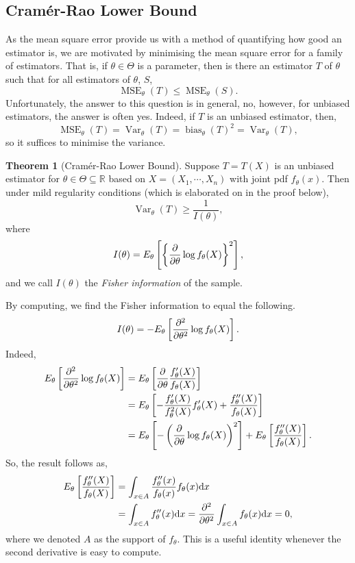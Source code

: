 \documentclass[
]{article}
\theoremstyle{definition}
\newtheorem{theorem}{Theorem}
\theoremstyle{definition}
\begin{document}
\hypertarget{cramuxe9r-rao-lower-bound}{%
\subsection{Cramér-Rao Lower Bound}\label{cramuxe9r-rao-lower-bound}}

As the mean square error provide us with a method of quantifying how
good an estimator is, we are motivated by minimising the mean square
error for a family of estimators. That is, if \(\theta \in \Theta\) is a
parameter, then is there an estimator \(T\) of \(\theta\) such that for
all estimators of \(\theta\), \(S\),
\[{\mathop{\mathrm{MSE}}}_{\theta}(T) \le {\mathop{\mathrm{MSE}}}_{\theta}(S).\]
Unfortunately, the answer to this question is in general, no, however,
for unbiased estimators, the answer is often yes. Indeed, if \(T\) is an
unbiased estimator, then,
\[{\mathop{\mathrm{MSE}}}_{\theta}(T) = {\mathop{\mathrm{Var}}}_\theta(T) = {\mathop{\mathrm{bias}}}_{\theta}(T)^2 = {\mathop{\mathrm{Var}}}_\theta(T),\]
so it suffices to minimise the variance.

\begin{theorem}[Cramér-Rao Lower Bound]
  Suppose \(T = T(X)\) is an unbiased estimator for \(\theta \in \Theta \subseteq \mathbb{R}\) 
  based on \(X = (X_1, \cdots, X_n)\) with joint pdf \(f_\theta(x)\). Then under 
  mild regularity conditions (which is elaborated on in the proof below),
  \[{\mathop{\mathrm{Var}}}_{\theta}(T) \ge \frac{1}{I(\theta)},\]
  where 
  \[I(\theta) = E_\theta\left[\left\{\pdv{\theta} \log f_\theta(X)\right\}^2\right],\]
  and we call \(I(\theta)\) the \textit{Fisher information} of the sample.
\end{theorem}

By computing, we find the Fisher information to equal the following.
\[I(\theta) = -E_\theta\left[\pdv[2]{\theta} \log f_\theta(X) \right].\]
Indeed, \[\begin{split}
  E_\theta\left[\pdv[2]{\theta} \log f_\theta(X) \right] 
    & = E_\theta\left[\pdv{\theta} \frac{f'_\theta(X)}{f_\theta(X)}\right]\\
    & = E_\theta\left[- \frac{f'_\theta(X)}{f^2_\theta(X)}f'_\theta(X) + \frac{f''_\theta(X)}{f_\theta(X)}\right]\\
    & = E_\theta\left[-\left(\pdv{\theta} \log f_\theta(X)\right)^2\right] + E_\theta\left[ \frac{f''_\theta(X)}{f_\theta(X)}\right].   
\end{split}\] So, the result follows as, \[\begin{split}
  E_\theta\left[ \frac{f''_\theta(X)}{f_\theta(X)}\right] 
    & = \int_{x \in A} \frac{f''_\theta(x)}{f_\theta(x)}f_\theta(x) \dd x\\
    & = \int_{x \in A} f''_\theta(x) \dd x = \pdv[2]{\theta} \int_{x \in A} f_\theta(x) \dd x = 0,
\end{split}\] where we denoted \(A\) as the support of \(f_\theta\).
This is a useful identity whenever the second derivative is easy to
compute.
\end{document}
